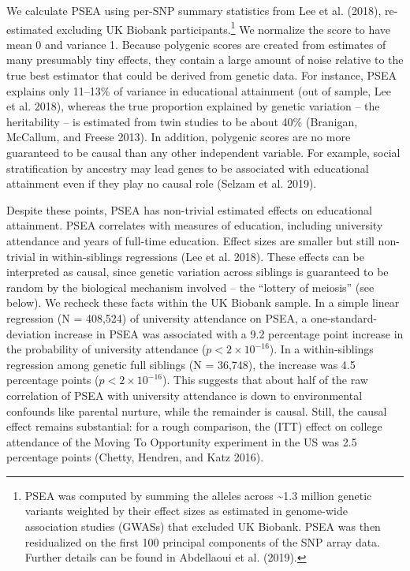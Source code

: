 \documentclass[
]{article}
\theoremstyle{definition}
\theoremstyle{definition}
\theoremstyle{definition}
\theoremstyle{definition}
\theoremstyle{remark}
\begin{document}
We calculate PSEA using per-SNP summary statistics from Lee et al. (2018),
re-estimated excluding UK Biobank participants.\footnote{PSEA was computed by summing the alleles across \textasciitilde1.3 million
  genetic variants weighted by their effect sizes as estimated in
  genome-wide association studies (GWASs) that excluded UK Biobank.
  PSEA was then residualized on the first 100 principal components of
  the SNP array data. Further details can be found in
  Abdellaoui et al. (2019).} We normalize the score to
have mean 0 and variance 1. Because polygenic scores are created from estimates
of many presumably tiny effects, they contain a large amount of noise relative
to the true best estimator that could be derived from genetic data. For
instance, PSEA explains only 11--13\% of variance in educational attainment (out
of sample, Lee et al. 2018), whereas the true proportion explained by genetic
variation -- the heritability -- is estimated from twin studies to be about 40\%
(Branigan, McCallum, and Freese 2013). In addition, polygenic scores are no more guaranteed
to be causal than any other independent variable. For example, social
stratification by ancestry may lead genes to be associated with educational
attainment even if they play no causal role (Selzam et al. 2019).

Despite these points, PSEA has non-trivial estimated effects on educational
attainment. PSEA correlates with measures of education, including university
attendance and years of full-time education. Effect sizes are smaller but still
non-trivial in within-siblings regressions (Lee et al. 2018). These effects can be
interpreted as causal, since genetic variation across siblings is guaranteed to
be random by the biological mechanism involved -- the ``lottery of meiosis'' (see
below). We recheck these facts within the UK Biobank sample. In a simple linear
regression (N = 408,524) of university attendance on PSEA, a
one-standard-deviation increase in PSEA was associated with a
9.2 percentage point increase in the probability of
university attendance (\(p < 2 \times 10^{-16}\)). In a within-siblings regression
among genetic full siblings (N = 36,748), the increase
was 4.5 percentage points (\(p < 2 \times 10^{-16}\)). This suggests that about half of the raw correlation of PSEA with
university attendance is down to environmental confounds like parental nurture,
while the remainder is causal. Still, the causal effect remains substantial: for
a rough comparison, the (ITT) effect on college attendance of the Moving To
Opportunity experiment in the US was 2.5 percentage points (Chetty, Hendren, and Katz 2016).
\end{document}
